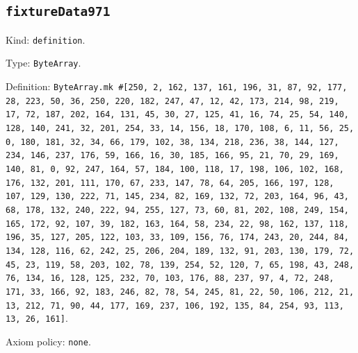 \documentclass[11pt]{article}
\begin{document}
\subsection*{\texttt{fixtureData971}}
\noindent Kind: \texttt{definition}.\par
\noindent Type: \texttt{ByteArray}.\par
\noindent Definition: \texttt{ByteArray.mk \#[250, 2, 162, 137, 161, 196, 31, 87, 92, 177, 28, 223, 50, 36, 250, 220, 182, 247, 47, 12, 42, 173, 214, 98, 219, 17, 72, 187, 202, 164, 131, 45, 30, 27, 125, 41, 16, 74, 25, 54, 140, 128, 140, 241, 32, 201, 254, 33, 14, 156, 18, 170, 108, 6, 11, 56, 25, 0, 180, 181, 32, 34, 66, 179, 102, 38, 134, 218, 236, 38, 144, 127, 234, 146, 237, 176, 59, 166, 16, 30, 185, 166, 95, 21, 70, 29, 169, 140, 81, 0, 92, 247, 164, 57, 184, 100, 118, 17, 198, 106, 102, 168, 176, 132, 201, 111, 170, 67, 233, 147, 78, 64, 205, 166, 197, 128, 107, 129, 130, 222, 71, 145, 234, 82, 169, 132, 72, 203, 164, 96, 43, 68, 178, 132, 240, 222, 94, 255, 127, 73, 60, 81, 202, 108, 249, 154, 165, 172, 92, 107, 39, 182, 163, 164, 58, 234, 22, 98, 162, 137, 118, 196, 35, 127, 205, 122, 103, 33, 109, 156, 76, 174, 243, 20, 244, 84, 134, 128, 116, 62, 242, 25, 206, 204, 189, 132, 91, 203, 130, 179, 72, 45, 23, 119, 58, 203, 102, 78, 139, 254, 52, 120, 7, 65, 198, 43, 248, 76, 134, 16, 128, 125, 232, 70, 103, 176, 88, 237, 97, 4, 72, 248, 171, 33, 166, 92, 183, 246, 82, 78, 54, 245, 81, 22, 50, 106, 212, 21, 13, 212, 71, 90, 44, 177, 169, 237, 106, 192, 135, 84, 254, 93, 113, 13, 26, 161]}.\par
\noindent Axiom policy: \texttt{none}.\par
\end{document}

